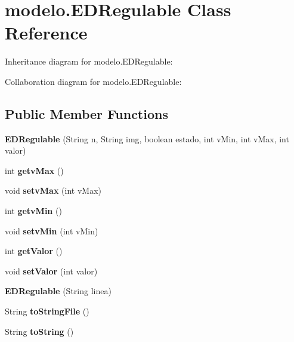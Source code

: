 \hypertarget{classmodelo_1_1_e_d_regulable}{}\section{modelo.\+E\+D\+Regulable Class Reference}
\label{classmodelo_1_1_e_d_regulable}


Inheritance diagram for modelo.\+E\+D\+Regulable\+:


Collaboration diagram for modelo.\+E\+D\+Regulable\+:
\subsection*{Public Member Functions}
\begin{DoxyCompactItemize}
\item 
\mbox{\label{classmodelo_1_1_e_d_regulable_aa269c52c783882ba76f21807dba145d7}} 
{\bfseries E\+D\+Regulable} (String n, String img, boolean estado, int v\+Min, int v\+Max, int valor)
\item 
\mbox{\label{classmodelo_1_1_e_d_regulable_a1cd8aedd21851c563533c41a7f093b89}} 
int {\bfseries getv\+Max} ()
\item 
\mbox{\label{classmodelo_1_1_e_d_regulable_a92f95c7d268e4c0c8f400822acff96e9}} 
void {\bfseries setv\+Max} (int v\+Max)
\item 
\mbox{\label{classmodelo_1_1_e_d_regulable_a29ff167bb69c6cdd44964d8a9703d098}} 
int {\bfseries getv\+Min} ()
\item 
\mbox{\label{classmodelo_1_1_e_d_regulable_a9b665b5cb50aa079f2c3ecde2101a96a}} 
void {\bfseries setv\+Min} (int v\+Min)
\item 
\mbox{\label{classmodelo_1_1_e_d_regulable_a1d6a61d20c823c5bd383b0e4e841644e}} 
int {\bfseries get\+Valor} ()
\item 
\mbox{\label{classmodelo_1_1_e_d_regulable_ad34348929673372480fe4f0e7fc50305}} 
void {\bfseries set\+Valor} (int valor)
\item 
\mbox{\label{classmodelo_1_1_e_d_regulable_a9e9ad99f51d31c38bf7c0a1bdb826ee4}} 
{\bfseries E\+D\+Regulable} (String linea)
\item 
\mbox{\label{classmodelo_1_1_e_d_regulable_a99c9d9c305eab98d121ba917a042ae3e}} 
String {\bfseries to\+String\+File} ()
\item 
\mbox{\label{classmodelo_1_1_e_d_regulable_a5802caa573177c48bda77ae4d9e487a9}} 
String {\bfseries to\+String} ()
\end{DoxyCompactItemize}


